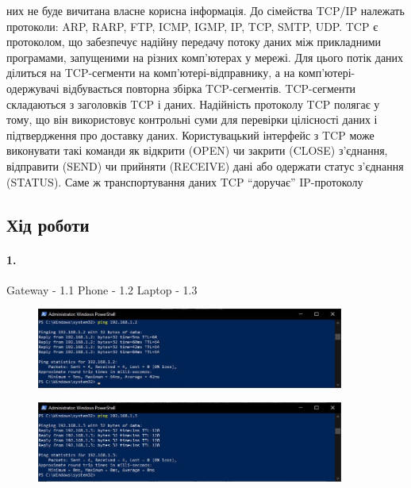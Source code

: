 \documentclass[12pt]{extarticle}
\begin{document}
них не буде вичитана власне корисна інформація.
До сімейства TCP/IP належать протоколи: ARP, RARP, FTP, ICMP, IGMP, IP, TCP,
SMTP, UDP.
TCP є протоколом, що забезпечує надійну передачу потоку даних між прикладними
програмами, запущеними на різних комп’ютерах у мережі. Для цього потік даних
ділиться на TCP-сегменти на комп’ютері-відправнику, а на комп’ютері-одержувачі
відбувається повторна збірка TCP-сегментів. TCP-сегменти складаються з заголовків
TCP і даних. Надійність протоколу TCP полягає у тому, що він використовує контрольні
суми для перевірки цілісності даних і підтвердження про доставку даних.
Користувацький інтерфейс з TCP може виконувати такі команди як відкрити (OPEN) чи
закрити (CLOSE) з’єднання, відправити (SEND) чи прийняти (RECEIVE) дані або
одержати статус з’єднання (STATUS). Саме ж транспортування даних TCP “доручає”
IP-протоколу

\break
\subsection*{Хід роботи}
\paragraph{1.}
Gateway - 1.1
Phone - 1.2
Laptop - 1.3


\vspace{12pt}


\begin{figure}[H]
    \centering
    \includegraphics[width=0.90\textwidth]{ping_phone.jpg}
    \caption{}
\end{figure}


\begin{figure}[H]
    \centering
    \includegraphics[width=0.90\textwidth]{ping_self.jpg}
    \caption{}
\end{figure}
\end{document}
